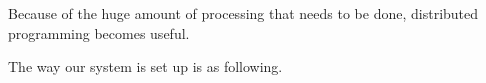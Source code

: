 Because of the huge amount of processing that needs to be done, distributed programming becomes useful. 


The way our system is set up is as following.

